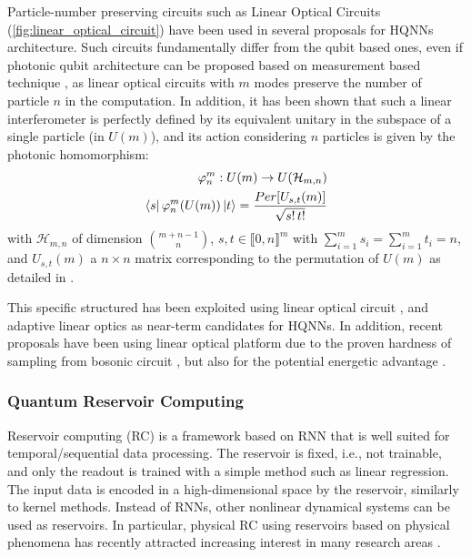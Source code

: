 \documentclass[aps,10pt,groupedaddress,prx,superscriptaddress,twocolumn,balancelastpage, tightenlines]{revtex4-2}
\theoremstyle{plain}  %
\begin{document}
Particle-number preserving circuits such as Linear Optical Circuits \cite{Aaronson2015Complexity} (\autoref{fig:linear_optical_circuit}) have been used in several proposals for
HQNNs architecture. Such circuits fundamentally differ from the qubit based ones, even if photonic qubit architecture can be proposed based on measurement based technique \cite{knill_scheme_2001, bartolucci_fusion_based_2023, aghaee_rad_scaling_2025}, as linear optical circuits with $m$ modes preserve the number of particle $n$ in the computation. In addition, it has been shown \cite{aaronson_computational_2011} that such a linear interferometer is perfectly defined by its equivalent unitary in the subspace of a single particle (in $U(m)$), and its action considering $n$ particles is given by the photonic homomorphism:
\begin{align}
    \varphi_n^m: U(m) \rightarrow U(\mathcal{H}_{m,n}) \\
    \bra{s} \varphi_n^m(U(m)) \ket{t} = \frac{Per[ U_{s,t}(m)]}{\sqrt{s! \,t !}}  
\end{align}
with $\mathcal{H}_{m,n}$ of dimension $\binom{m+n-1}{n}$, $s, t \in \llbracket 0, n \rrbracket^m$ with $\sum_{i=1}^m s_i = \sum_{i=1}^m t_i = n$, and $U_{s,t}(m)$ a $n \times n$ matrix corresponding to the permutation of $U(m)$ as detailed in \cite{aaronson_computational_2011}. \newline


This specific structured has been exploited using linear optical circuit \cite{austin_hybrid_2025, killoran_continuous-variable_2019,
yin_experimental_2025, gan_fock_2022}, and adaptive linear optics \cite{chabaud_quantum_2021, monbroussou_toward_2025, monbroussou_photonic_2025, hoch_quantum_2025} as near-term candidates for HQNNs. In addition, recent proposals \cite{kolarovszki_generative_2026, gottlieb_efficient_2026} have been using linear optical platform due to the proven hardness of sampling from bosonic circuit \cite{aaronson_computational_2011, lund_quantum_2017, deshpande_quantum_2022, brod_complexity_2015}, but also for the potential energetic advantage \cite{soret_quantum_2026}.

            

\subsubsection{Quantum Reservoir Computing}\label{subsubsec:Quantum_Reservoir_Computing}


Reservoir computing (RC) is a framework based on \gls{RNN} that is well suited for temporal/sequential data processing. The reservoir is fixed, i.e., not trainable, and only the readout is trained with a simple method such as linear regression. The input data is encoded in a high-dimensional space by the reservoir, similarly to kernel methods. Instead of \glspl{RNN}, other nonlinear dynamical systems can be used as reservoirs. In particular, physical RC using reservoirs based on physical phenomena has recently attracted increasing interest in many research areas \cite{tanaka_recent_2019, chmielewski_quantum_2026}.
\end{document}
